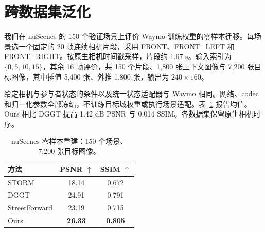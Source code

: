 \section{跨数据集泛化}
\label{sec:supp-generalization}
我们在 nuScenes 的 150 个验证场景上评价 Waymo 训练权重的零样本迁移。每场景选一个固定的 20 帧连续相机片段，采用 FRONT、FRONT\_LEFT 和 FRONT\_RIGHT。按原生相机时间戳采样，片段约 1.67 s。输入索引为 $\{0,5,10,15\}$，其余 16 帧评价，共 150 个片段、1,800 张上下文图像与 7,200 张目标图像，其中插值 5,400 张、外推 1,800 张，输出为 $240\times160$。

给定相机与参与者状态的条件以及统一状态适配器与 Waymo 相同。网络、codec 和归一化参数全部冻结，不训练目标域权重或执行场景适配。表~\ref{tab:generalization} 报告均值。Ours 相比 DGGT 提高 1.42 dB PSNR 与 0.014 SSIM。各数据集保留原生相机时序。

\begin{table}[H]
\centering\small
\setlength{\tabcolsep}{4pt}
\caption{nuScenes 零样本重建：150 个场景、7,200 张目标图像。}
\label{tab:generalization}
\begin{tabular}{@{}lcc@{}}
\toprule
方法 & PSNR $\uparrow$ & SSIM $\uparrow$ \\
\midrule
STORM & 18.14 & 0.672 \\
DGGT & 24.91 & 0.791 \\
StreetForward & 23.19 & 0.715 \\
Ours & \textbf{26.33} & \textbf{0.805} \\
\bottomrule
\end{tabular}
\end{table}
